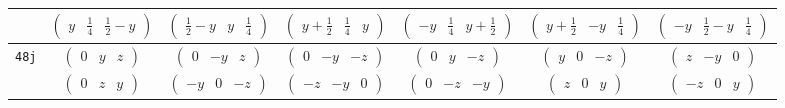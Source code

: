 \documentclass[fleqn,9pt,landscape]{jsarticle}
\begin{document}
\begin{center}
\begin{longtable}{ccccccc}
& $ \begin{pmatrix} y & \frac{1}{4} & \frac{1}{2} - y \end{pmatrix} $ & $ \begin{pmatrix} \frac{1}{2} - y & y & \frac{1}{4} \end{pmatrix} $ & $ \begin{pmatrix} y + \frac{1}{2} & \frac{1}{4} & y \end{pmatrix} $ & $ \begin{pmatrix} - y & \frac{1}{4} & y + \frac{1}{2} \end{pmatrix} $ & $ \begin{pmatrix} y + \frac{1}{2} & - y & \frac{1}{4} \end{pmatrix} $ & $ \begin{pmatrix} - y & \frac{1}{2} - y & \frac{1}{4} \end{pmatrix} $ \\ \hline
{\tt 48j} & $ \begin{pmatrix} 0 & y & z \end{pmatrix} $ & $ \begin{pmatrix} 0 & - y & z \end{pmatrix} $ & $ \begin{pmatrix} 0 & - y & - z \end{pmatrix} $ & $ \begin{pmatrix} 0 & y & - z \end{pmatrix} $ & $ \begin{pmatrix} y & 0 & - z \end{pmatrix} $ & $ \begin{pmatrix} z & - y & 0 \end{pmatrix} $ \\
& $ \begin{pmatrix} 0 & z & y \end{pmatrix} $ & $ \begin{pmatrix} - y & 0 & - z \end{pmatrix} $ & $ \begin{pmatrix} - z & - y & 0 \end{pmatrix} $ & $ \begin{pmatrix} 0 & - z & - y \end{pmatrix} $ & $ \begin{pmatrix} z & 0 & y \end{pmatrix} $ & $ \begin{pmatrix} - z & 0 & y \end{pmatrix} $ \\

\end{longtable}
\end{center}
\end{document}
